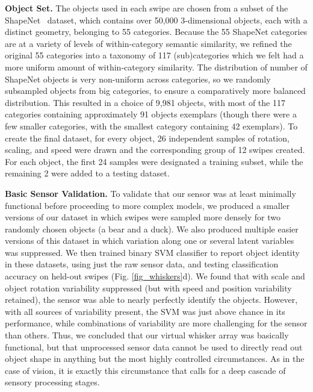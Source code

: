 \textbf{Object Set.} The objects used in each swipe are chosen from a subset of the ShapeNet~\cite{Chang2015} dataset, which contains over 50,000 3-dimensional objects, each with a distinct geometry, belonging to 55 categories.
Because the 55 ShapeNet categories are at a variety of levels of within-category semantic similarity, we refined the original 55 categories into a taxonomy of 117 (sub)categories which we felt had a more uniform amount of within-category similarity. 
The distribution of number of ShapeNet objects is very non-uniform across categories, so we randomly subsampled objects from big categories, to ensure a comparatively more balanced distribution.  
This resulted in a choice of 9,981 objects, with most of the 117 categories containing approximately 91 objects exemplars (though there were a few smaller categories, with the smallest category containing 42 exemplars).
To create the final dataset, for every object, 26 independent samples of rotation, scaling, and speed were drawn and the corresponding group of 12 swipes created.   
For each object, the first 24 samples were designated a training subset, while the remaining 2 were added to a testing dataset. 


\textbf{Basic Sensor Validation.} To validate that our sensor was at least minimally functional before proceeding to more complex models, we produced a smaller versions of our dataset in which swipes were sampled more densely for two randomly chosen objects (a bear and a duck).  
We also produced multiple easier versions of this dataset in which variation along one or several latent variables was suppressed. 
We then trained binary SVM classifier to report object identity in these datasets, using just the raw sensor data, and testing classification accuracy on held-out swipes (Fig. \ref{fig_whiskers}d).  We found that with scale and object rotation variability suppressed (but with speed and position variability retained), the sensor was able to nearly perfectly identify the objects.  
However, with all sources of variability present, the SVM was just above chance in its performance,  
while combinations of variability are more challenging for the sensor than others. 
Thus, we concluded that our virtual whisker array was basically functional, but that unprocessed sensor data cannot be used to directly read out object shape in anything but the most highly controlled circumstances.
As in the case of vision, it is exactly this circumstance that calls for a deep cascade of sensory processing stages. 

